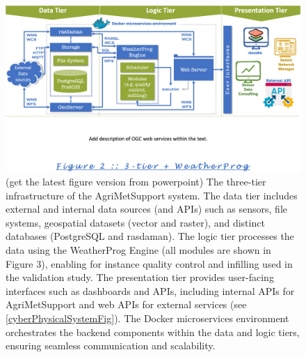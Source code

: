 \documentclass[authoryear,preprint,review,12pt]{elsarticle}
\begin{document}
\begin{figure}[!t] %
	\centering %
	\includegraphics[angle=0,scale=.4,trim=0cm 6.2cm 0cm 0cm,clip]{figures/Fig02_Tiers.png}
	\caption{ (get the latest figure version from powerpoint) The three-tier infrastructure of the AgriMetSupport system. The data tier includes external and internal data sources (and APIs) such as sensors, file systems, geospatial datasets (vector and raster), and distinct databases (PostgreSQL and rasdaman). The logic tier processes the data using the WeatherProg Engine (all modules are shown in Figure 3), enabling for instance quality control and infilling used in the validation study. The presentation tier provides user-facing interfaces such as dashboards and APIs, including internal APIs for Agri\-Met\-Support and web APIs for external services (see \cref{cyberPhysicalSystemFig}). The Docker microservices environment orchestrates the backend components within the data and logic tiers, ensuring seamless communication and scalability.}
	\label{Fig_tiers}
\end{figure}
\end{document}
